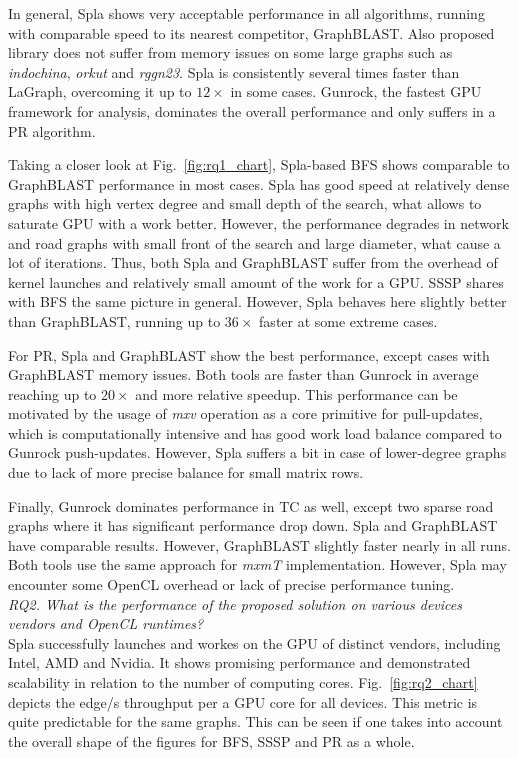 In general, Spla shows very acceptable performance in all algorithms, running with comparable speed to its nearest competitor, GraphBLAST. Also proposed library does not suffer from memory issues on some large graphs such as \textit{indochina}, \textit{orkut} and \textit{rggn23}. Spla is consistently several times faster than LaGraph, overcoming it up to $12\times$ in some cases. Gunrock, the fastest GPU framework for analysis, dominates the overall performance and only suffers in a PR algorithm.

Taking a closer look at Fig.~\ref{fig:rq1_chart}, Spla-based BFS shows comparable to GraphBLAST performance in most cases. Spla has good speed at relatively dense graphs with high vertex degree and small depth of the search, what allows to saturate GPU with a work better. However, the performance degrades in network and road graphs with small front of the search and large diameter, what cause a lot of iterations. Thus, both Spla and GraphBLAST suffer from the overhead of kernel launches and relatively small amount of the work for a GPU. SSSP shares with BFS the same picture in general. However, Spla behaves here slightly better than GraphBLAST, running up to $36\times$ faster at some extreme cases.

For PR, Spla and GraphBLAST show the best performance, except cases with GraphBLAST memory issues. Both tools are faster than Gunrock in average reaching up to $20\times$ and more relative speedup. This performance can be motivated by the usage of \textit{mxv} operation as a core primitive for pull-updates, which is computationally intensive and has good work load balance compared to Gunrock push-updates. However, Spla suffers a bit in case of lower-degree graphs due to lack of more precise balance for small matrix rows.

Finally, Gunrock dominates performance in TC as well, except two sparse road graphs where it has significant performance drop down. Spla and GraphBLAST have comparable results. However, GraphBLAST slightly faster nearly in all runs. Both tools use the same approach for \textit{mxmT} implementation. However, Spla may encounter some OpenCL overhead or lack of precise performance tuning.\\

\textit{RQ2. What is the performance of the proposed solution on various devices vendors and OpenCL runtimes?}\\

Spla successfully launches and workes on the GPU of distinct vendors, including Intel, AMD and Nvidia. It shows promising performance and demonstrated scalability in relation to the number of computing cores. Fig.~\ref{fig:rq2_chart} depicts the edge/s throughput per a GPU core for all devices. This metric is quite predictable for the same graphs. This can be seen if one takes into account the overall shape of the figures for BFS, SSSP and PR as a whole.

